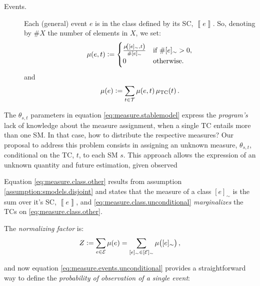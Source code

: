 \documentclass[a4paper, 10pt]{article}
\newcommand{\at}[1]{\ensuremath{\!\del{#1}}}
\newcommand{\fml}[1]{\ensuremath{{\cal #1}}}
\newcommand{\stablecore}[1]{\ensuremath{\left\llbracket #1 \right\rrbracket}}
\newcommand{\pw}[1]{\ensuremath{\mu\at{#1}}}
\newcommand{\pwcfname}{\ensuremath{\mu_{\textrm{TC}}}}
\newcommand{\pwc}[1]{\ensuremath{\pwcfname\at{#1}}}
\newcommand{\class}[1]{\ensuremath{[{#1}]_{\sim}}}
\newcommand{\indepclass}{\ensuremath{\Diamond}}
\begin{document}
\begin{description}
    \item[Events.] \label{item:event.cases} Each (general) event $e$ is in the class defined by its \acl{SC}, $\stablecore{e}$. So, denoting by $\# X$ the number of elements in $X$, we set:
          \begin{equation}
              \pw{e, t} :=
              \begin{cases}
                  \frac{\pw{\class{e}, t}}{\# \class{e}} & \text{if~}\# \class{e} > 0, \\
                  0                                      & \text{otherwise}.
              \end{cases}
              \label{eq:measure.events}
          \end{equation}
          and
          \begin{equation}
              \pw{e} := \sum_{t\in\fml{T}} \pw{e, t} \pwc{t}.
              \label{eq:measure.events.unconditional}
          \end{equation}
\end{description}



The $\theta_{s,t}$ parameters in equation \eqref{eq:measure.stablemodel} express the \emph{program's} lack of knowledge about the measure assignment, when a single \acl{TC} entails more than one \acl{SM}. In that case, how to distribute the respective measures? Our proposal to address this problem consists in assigning an unknown measure, $\theta_{s,t}$, conditional on the \acl{TC}, $t$, to each \acl{SM} $s$. This approach allows the expression of an unknown quantity and future estimation, given observed


Equation \eqref{eq:measure.class.other} results from assumption \ref{assumption:smodels.disjoint} and states that the measure of a class $\class{e}$ is the sum over it's \acl{SC}, $\stablecore{e}$, and \eqref{eq:measure.class.unconditional} \emph{marginalizes} the \acp{TC} on \eqref{eq:measure.class.other}.

The \emph{normalizing factor} is:
\begin{equation*}
    Z :=
    \sum_{e \in \fml{E}} \pw{e} =
    \sum_{\class{e} \in \class{\fml{E}}} \pw{\class{e}},
\end{equation*}

and now equation \eqref{eq:measure.events.unconditional} provides a straightforward way to define the \emph{probability of observation of a single event}:
\end{document}
